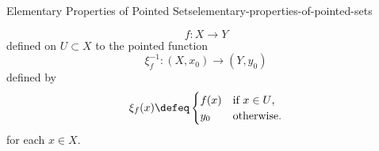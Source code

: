 \begin{proposition}{Elementary Properties of Pointed Sets}{elementary-properties-of-pointed-sets}
\begin{enumerate}
\begin{enumerate}
\begin{enumerate}
\[                                f%
                                \colon%
                                X%
                                \to%
                                Y%
                            \]%
                            defined on $U\subset X$ to the pointed function
                            \[
                                \xi^{-1}_{f}%
                                \colon%
                                (X,x_{0})%
                                \to%
                                (Y,y_{0})%
                            \]%
                            defined by
                            \[
                                \xi_{f}(x)%
                                \defeq%
                                \begin{cases}
                                    f(x)  &\text{if $x\in U$,}\\
                                    y_{0} &\text{otherwise.}
                                \end{cases}
                            \]%
                            for each $x\in X$.
                    \end{enumerate}
            \end{enumerate}
    \end{enumerate}
\end{proposition}
